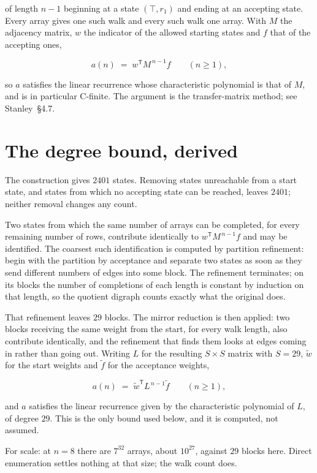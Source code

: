 \documentclass[11pt]{article}
\theoremstyle{definition}
\begin{document}
of length $n-1$ beginning at a state $(\top,r_1)$ and ending at an accepting state. Every array gives one such walk and every such walk one array. With $M$ the adjacency matrix, $w$ the indicator of the allowed starting states and $f$ that of the accepting ones,

\[a(n) \;=\; w^{\mathsf T} M^{\,n-1} f \qquad (n \ge 1),\]

so $a$ satisfies the linear recurrence whose characteristic polynomial is that of $M$, and is in particular C-finite. The argument is the transfer-matrix method; see Stanley~\S4.7.

\section{The degree bound, derived}

The construction gives $2401$ states. Removing states unreachable from a start state, and states from which no accepting state can be reached, leaves $2401$; neither removal changes any count.

Two states from which the same number of arrays can be completed, for every remaining number of rows, contribute identically to $w^{\mathsf T}M^{\,n-1}f$ and may be identified. The coarsest such identification is computed by partition refinement: begin with the partition by acceptance and separate two states as soon as they send different numbers of edges into some block. The refinement terminates; on its blocks the number of completions of each length is constant by induction on that length, so the quotient digraph counts exactly what the original does.

That refinement leaves $29$ blocks. The mirror reduction is then applied: two blocks receiving the same weight from the start, for every walk length, also contribute identically, and the refinement that finds them looks at edges coming in rather than going out. Writing $L$ for the resulting $S \times S$ matrix with $S = 29$, $\tilde w$ for the start weights and $\tilde f$ for the acceptance weights,

\[a(n) \;=\; \tilde w^{\mathsf T} L^{\,n-1} \tilde f \qquad (n \ge 1),\]

and $a$ satisfies the linear recurrence given by the characteristic polynomial of $L$, of degree $29$. This is the only bound used below, and it is computed, not assumed.

For scale: at $n = 8$ there are $7^{32}$ arrays, about $10^{27}$, against $29$ blocks here. Direct enumeration settles nothing at that size; the walk count does.
\end{document}
